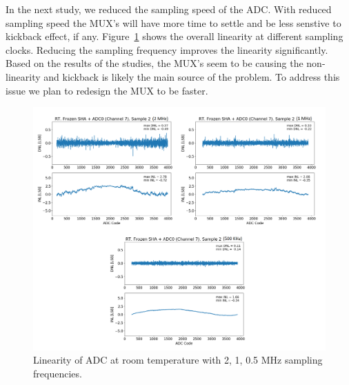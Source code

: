 In the next study, we reduced the sampling speed of the ADC. With reduced sampling speed the MUX's will have more time to settle and be less senstive to kickback effect, if any. Figure~\ref{fig:linearity_mux_speed} shows the overall linearity at different sampling clocks. Reducing the sampling frequency improves the linearity significantly. Based on the results of the studies, the MUX's seem to be causing the non-linearity and kickback is likely the main source of the problem. To address this issue we plan to redesign the MUX to be faster.
\begin{figure}[h!]
\centering
  \includegraphics[width=1.0\linewidth]{figures/prakash_fig/linearity_mux_speed.png}
  \caption{Linearity of ADC at room temperature with 2, 1, 0.5 MHz sampling frequencies.}
  \label{fig:linearity_mux_speed}
\end{figure}


